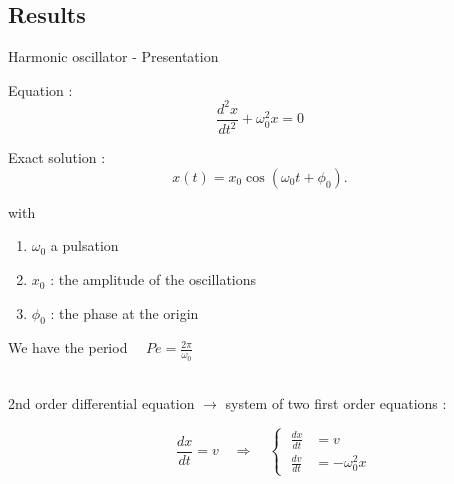 \subsection{Results}

\begin{frame}{Harmonic oscillator - Presentation}
	\begin{minipage}{0.48\linewidth}
		Equation :
		$$\frac{d^2 x}{d t^2}+\omega_0^2 x = 0$$
	\end{minipage}
	\begin{minipage}{0.48\linewidth}
		Exact solution :
		$$x(t) = x_0 \cos(\omega_{0}t+\phi_0).$$ 
	\end{minipage}	
	with
	\begin{enumerate}[\textbullet]
		\item $\omega_0$ a pulsation
		\item $x_0$ : the amplitude of the oscillations
		\item $\phi_0$ : the phase at the origin
	\end{enumerate}
	We have the period $\quad Pe=\frac{2\pi}{\omega_0}$

	\; \\
	
	2nd order differential equation $\rightarrow$ system of two first order equations :
		
	$$\qquad \frac{d x}{d t}=v \quad \Rightarrow \quad \left\{\;\begin{aligned}
		\frac{d x}{d t}&=v \\
		\frac{d v}{d t}&=-\omega_0^2 x
	\end{aligned}\right.
	$$  
	
	\end{frame}
